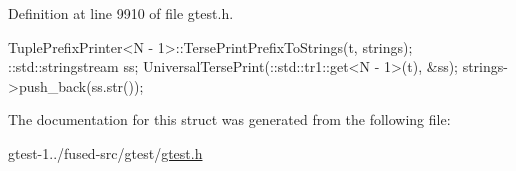 \-Definition at line 9910 of file gtest.\-h.


\begin{DoxyCode}
                                                                          {
    TuplePrefixPrinter<N - 1>::TersePrintPrefixToStrings(t, strings);
    ::std::stringstream ss;
    UniversalTersePrint(::std::tr1::get<N - 1>(t), &ss);
    strings->push_back(ss.str());
  }
\end{DoxyCode}


\-The documentation for this struct was generated from the following file\-:\begin{DoxyCompactItemize}
\item 
gtest-\/1../fused-\/src/gtest/\hyperlink{fused-src_2gtest_2gtest_8h}{gtest.\-h}\end{DoxyCompactItemize}

